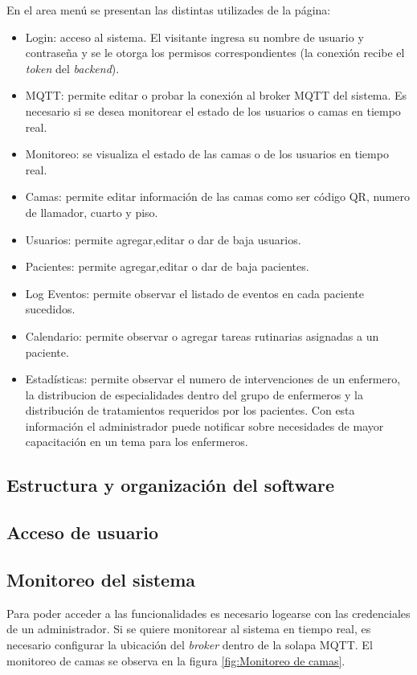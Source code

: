 En el area menú se presentan las distintas utilizades de la página:
\begin{itemize}
\item Login: acceso al sistema. El visitante ingresa su nombre de usuario y contraseña y se le otorga los permisos correspondientes (la conexión recibe el \textit{token} del \textit{backend}).
\item MQTT: permite editar o probar la conexión al broker MQTT del sistema. Es necesario si se desea monitorear el estado de los usuarios o camas en tiempo real.
\item Monitoreo: se visualiza el estado de las camas o de los usuarios en tiempo real.
\item Camas: permite editar información de las camas como ser código QR, numero de llamador, cuarto y piso.
\item Usuarios: permite agregar,editar o dar de baja usuarios.
\item Pacientes: permite agregar,editar o dar de baja pacientes.
\item Log Eventos: permite observar el listado de eventos en cada paciente sucedidos.
\item Calendario: permite observar o agregar tareas rutinarias asignadas a un paciente.
\item Estadísticas: permite observar el numero de intervenciones de un enfermero, la distribucion de especialidades dentro del grupo de enfermeros y la distribución de tratamientos requeridos por los pacientes. Con esta información el administrador puede notificar sobre necesidades de mayor capacitación en un tema para los enfermeros.
\end{itemize}


\subsection{Estructura y organización del software}
\subsection{Acceso de usuario}
\subsection{Monitoreo del sistema}
Para poder acceder a las funcionalidades es necesario logearse con las credenciales de un administrador. Si se quiere monitorear al sistema en tiempo real, es necesario configurar la ubicación del \textit{broker} dentro de la solapa MQTT. El monitoreo de camas se observa en la figura \ref{fig:Monitoreo de camas}.

